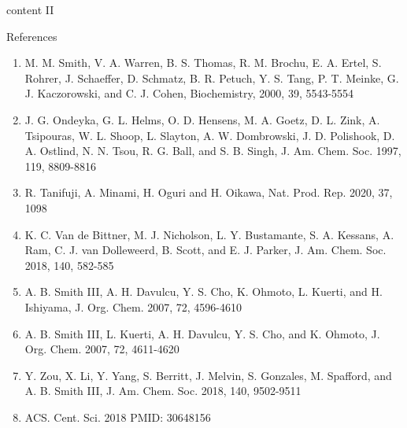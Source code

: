 \documentclass[t, 11pt, xcolor=dvipsnames]{beamer}
\begin{document}
\begin{frame}[plain]{content II}
  \hypertarget<1>{slide3}{}
\end{frame}
\begin{frame}[plain]{References}
  \scriptsize
  \begin{enumerate}
  \item  M. M. Smith, V. A. Warren, B. S. Thomas, R. M. Brochu, E. A. Ertel, S. Rohrer, J. Schaeffer, D. Schmatz, B. R. Petuch, Y. S. Tang, P. T. Meinke, G. J. Kaczorowski, and C. J. Cohen, Biochemistry, 2000, 39, 5543-5554 \\
  \item J. G. Ondeyka, G. L. Helms, O. D. Hensens, M. A. Goetz, D. L. Zink, A. Tsipouras, W. L. Shoop, L. Slayton, A. W. Dombrowski, J. D. Polishook, D. A. Ostlind, N. N. Tsou, R. G. Ball, and S. B. Singh, J. Am. Chem. Soc. 1997, 119, 8809-8816 \\
  \item R. Tanifuji, A. Minami, H. Oguri and H. Oikawa, Nat. Prod. Rep. 2020, 37, 1098 \\
  \item K. C. Van de Bittner, M. J. Nicholson, L. Y. Bustamante, S. A. Kessans, A. Ram, C. J. van Dolleweerd, B. Scott, and E. J. Parker, J. Am. Chem. Soc. 2018, 140, 582-585 \\
  \item A. B. Smith III, A. H. Davulcu, Y. S. Cho, K. Ohmoto, L. Kuerti, and H. Ishiyama, J. Org. Chem. 2007, 72, 4596-4610 \\
  \item A. B. Smith III, L. Kuerti, A. H. Davulcu, Y. S. Cho, and K. Ohmoto, J. Org. Chem. 2007, 72, 4611-4620 \\
  \item Y. Zou, X. Li, Y. Yang, S. Berritt, J. Melvin, S. Gonzales, M. Spafford, and A. B. Smith III, J. Am. Chem. Soc. 2018, 140, 9502-9511 \\
  \item ACS. Cent. Sci. 2018 PMID: 30648156 \\
  \end{enumerate}
\end{frame}
\end{document}
